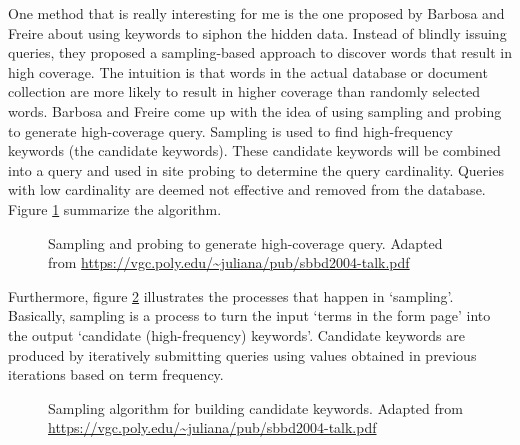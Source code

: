 \documentclass[letterpaper,11pt]{article}
\begin{document}
One method that is really interesting for me is the one proposed by Barbosa and Freire \cite{barbosa2010siphoning} about using keywords to siphon the hidden data. Instead of blindly issuing queries, they proposed a sampling-based approach to discover words that result in high coverage. The intuition is that words in the actual database or document collection are more likely to result in higher coverage than randomly selected words. Barbosa and Freire \cite{barbosa2010siphoning} come up with the idea of using sampling and probing to generate high-coverage query. Sampling is used to find high-frequency keywords (the candidate keywords). These candidate keywords will be combined into a query and used in site probing to determine the query cardinality. Queries with low cardinality are deemed not effective and removed from the database. Figure \ref{fig:sampling_probing} summarize the algorithm. 

\begin{figure}[H]
\centering
\caption{Sampling and probing to generate high-coverage query. Adapted from  \url{https://vgc.poly.edu/~juliana/pub/sbbd2004-talk.pdf}}
\label{fig:sampling_probing}
\end{figure}

Furthermore, figure \ref{fig:sampling} illustrates the processes that happen in `sampling'. Basically, sampling is a process to turn the input `terms in the form page' into the output `candidate (high-frequency) keywords'. Candidate keywords are produced by iteratively submitting queries using values obtained in previous iterations based on term frequency. 

\begin{figure}[H]
	\centering
	\caption{Sampling algorithm for building candidate keywords. Adapted from \url{https://vgc.poly.edu/~juliana/pub/sbbd2004-talk.pdf}}
	\label{fig:sampling}
\end{figure}
\end{document}

